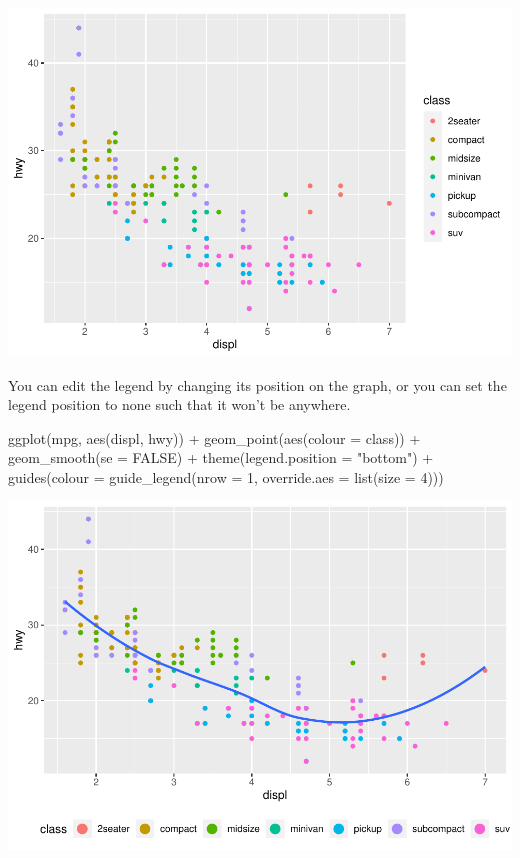 \documentclass[
]{article}
\newenvironment{Shaded}{\begin{snugshade}}{\end{snugshade}}
\newcommand{\AttributeTok}[1]{\textcolor[rgb]{0.77,0.63,0.00}{#1}}
\newcommand{\ConstantTok}[1]{\textcolor[rgb]{0.00,0.00,0.00}{#1}}
\newcommand{\DecValTok}[1]{\textcolor[rgb]{0.00,0.00,0.81}{#1}}
\newcommand{\FunctionTok}[1]{\textcolor[rgb]{0.00,0.00,0.00}{#1}}
\newcommand{\NormalTok}[1]{#1}
\newcommand{\SpecialCharTok}[1]{\textcolor[rgb]{0.00,0.00,0.00}{#1}}
\newcommand{\StringTok}[1]{\textcolor[rgb]{0.31,0.60,0.02}{#1}}
\begin{document}
\includegraphics{Journal_files/figure-latex/unnamed-chunk-56-4.pdf}

You can edit the legend by changing its position on the graph, or you
can set the legend position to none such that it won't be anywhere.

\begin{Shaded}
\begin{Highlighting}[]
\FunctionTok{ggplot}\NormalTok{(mpg, }\FunctionTok{aes}\NormalTok{(displ, hwy)) }\SpecialCharTok{+}
  \FunctionTok{geom\_point}\NormalTok{(}\FunctionTok{aes}\NormalTok{(}\AttributeTok{colour =}\NormalTok{ class)) }\SpecialCharTok{+}
  \FunctionTok{geom\_smooth}\NormalTok{(}\AttributeTok{se =} \ConstantTok{FALSE}\NormalTok{) }\SpecialCharTok{+}
  \FunctionTok{theme}\NormalTok{(}\AttributeTok{legend.position =} \StringTok{"bottom"}\NormalTok{) }\SpecialCharTok{+}
  \FunctionTok{guides}\NormalTok{(}\AttributeTok{colour =} \FunctionTok{guide\_legend}\NormalTok{(}\AttributeTok{nrow =} \DecValTok{1}\NormalTok{, }\AttributeTok{override.aes =} \FunctionTok{list}\NormalTok{(}\AttributeTok{size =} \DecValTok{4}\NormalTok{)))}
\end{Highlighting}
\end{Shaded}

\includegraphics{Journal_files/figure-latex/unnamed-chunk-57-1.pdf}
\end{document}
